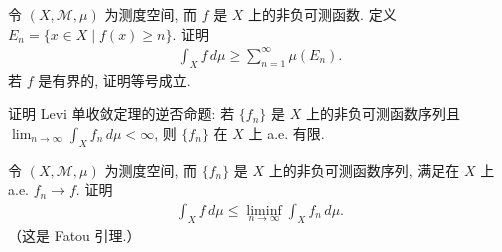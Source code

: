 \documentclass[../../main.tex]{subfiles}
\begin{document}
\begin{exercise}\label{exercise:ch18-20}
令 $(X,\mathcal{M},\mu)$ 为测度空间, 而 $f$ 是 $X$ 上的非负可测函数. 定义 $E_{n}=\{x\in X\mid f(x)\geqslant n\}$. 证明
\begin{align*}
\int_{X}f\,d\mu\geqslant\sum_{n=1}^{\infty}\mu(E_{n}).
\end{align*}
若 $f$ 是有界的, 证明等号成立.
\end{exercise}

\begin{exercise}\label{exercise:ch18-21}
证明 Levi 单收敛定理的逆否命题: 若 $\{f_{n}\}$ 是 $X$ 上的非负可测函数序列且 $\lim_{n\to\infty}\int_{X}f_{n}\,d\mu<\infty$, 则 $\{f_{n}\}$ 在 $X$ 上 a.e. 有限.
\end{exercise}

\begin{exercise}\label{exercise:ch18-22}
令 $(X,\mathcal{M},\mu)$ 为测度空间, 而 $\{f_{n}\}$ 是 $X$ 上的非负可测函数序列, 满足在 $X$ 上 a.e. $f_{n}\to f$. 证明
\begin{align*}
\int_{X}f\,d\mu\leqslant\liminf_{n\to\infty}\int_{X}f_{n}\,d\mu.
\end{align*}
（这是 Fatou 引理.）
\end{exercise}
\end{document}
